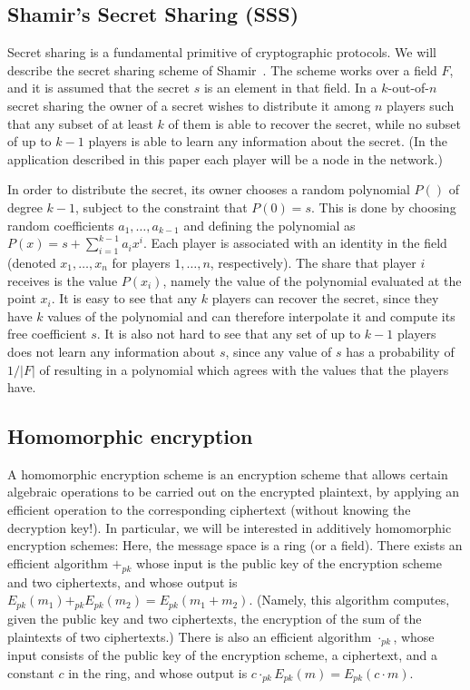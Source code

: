 \documentclass[10pt]{svjour3}
\begin{document}
\subsection{Shamir's Secret Sharing (SSS)}
Secret sharing is a fundamental primitive of cryptographic
protocols. We will describe the  secret sharing scheme of
Shamir~\cite{SSS}. The scheme works over a field $F$, and it is
assumed that the secret $s$ is an element in that field. In a
$k$-out-of-$n$ secret sharing the owner of a secret wishes to
distribute it among $n$ players such that any subset of at least $k$ of
them is able to recover the secret, while no subset of up to $k-1$
players is able to learn any information about the secret. (In the
application described in this paper each player will be a node in the
network.)

In order to distribute the secret, its owner chooses a random
polynomial $P()$ of degree $k-1$, subject to the constraint that
$P(0)=s$. This is done by choosing random coefficients
$a_1,\ldots,a_{k-1}$ and defining the polynomial as
$P(x)=s+\sum_{i=1}^{k-1}a_ix^i$. Each player is associated with an
identity in the field (denoted $x_1,\ldots,x_n$\/ for players
$1,\ldots,n$, respectively). The share that player $i$ receives is the
value $P(x_i)$, namely the value of the polynomial evaluated at the
point $x_i$.  It is easy to see that any $k$ players can recover the
secret, since they have $k$ values of the polynomial and can therefore
interpolate it and compute its free coefficient $s$. It is also not
hard to see that any set of up to $k-1$ players does not learn any
information about $s$, since any value of $s$ has a probability of
$1/|F|$ of resulting in a polynomial which agrees with the values that
the players have.
\subsection{Homomorphic encryption}
A homomorphic encryption scheme is an encryption scheme that
allows certain algebraic operations to be carried out on the
encrypted plaintext, by applying an efficient operation to the
corresponding ciphertext (without knowing the decryption key!). In
particular, we will be interested in additively homomorphic
encryption schemes: Here, the message space is a ring (or a
field). There exists an efficient algorithm $+_{pk}$ whose input
is the public key of the encryption scheme and two ciphertexts,
and whose output is $E_{pk}(m_1) +_{pk} E_{pk}(m_2) = E_{pk}(m_1 +
m_2)$. (Namely, this algorithm computes, given the public key and
two ciphertexts, the encryption of the sum of the plaintexts of
two ciphertexts.) There is also an efficient algorithm
$\cdot_{pk}$, whose input consists of the public key of the
encryption scheme, a ciphertext, and a constant $c$ in the ring,
and whose output is  $c\cdot_{pk} E_{pk}(m) = E_{pk}(c \cdot m)$.
\end{document}
